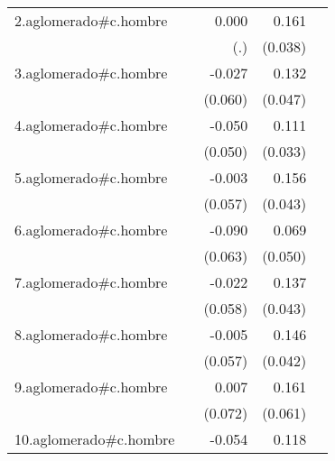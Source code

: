 {\begin{longtable}{l*{4}{D{.}{.}{-1}}}
\addlinespace
2.aglomerado#c.hombre&                     &       0.000         &       0.161\sym{***}&                     \\
            &                     &         (.)         &     (0.038)         &                     \\
\addlinespace
3.aglomerado#c.hombre&                     &      -0.027         &       0.132\sym{**} &                     \\
            &                     &     (0.060)         &     (0.047)         &                     \\
\addlinespace
4.aglomerado#c.hombre&                     &      -0.050         &       0.111\sym{***}&                     \\
            &                     &     (0.050)         &     (0.033)         &                     \\
\addlinespace
5.aglomerado#c.hombre&                     &      -0.003         &       0.156\sym{***}&                     \\
            &                     &     (0.057)         &     (0.043)         &                     \\
\addlinespace
6.aglomerado#c.hombre&                     &      -0.090         &       0.069         &                     \\
            &                     &     (0.063)         &     (0.050)         &                     \\
\addlinespace
7.aglomerado#c.hombre&                     &      -0.022         &       0.137\sym{**} &                     \\
            &                     &     (0.058)         &     (0.043)         &                     \\
\addlinespace
8.aglomerado#c.hombre&                     &      -0.005         &       0.146\sym{***}&                     \\
            &                     &     (0.057)         &     (0.042)         &                     \\
\addlinespace
9.aglomerado#c.hombre&                     &       0.007         &       0.161\sym{**} &                     \\
            &                     &     (0.072)         &     (0.061)         &                     \\
\addlinespace
10.aglomerado#c.hombre&                     &      -0.054         &       0.118\sym{**} &                     \\

\end{longtable}}
